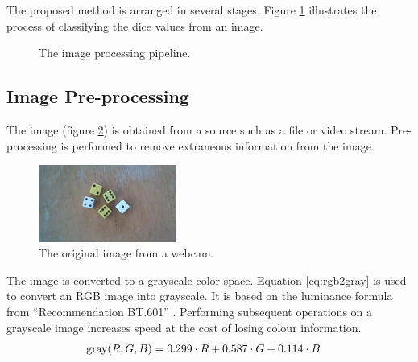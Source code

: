 \documentclass[conference]{IEEEtran}
\begin{document}
The proposed method is arranged in several stages.
Figure \ref{fig:stages} illustrates the process of classifying the dice values from an image. 
\begin{figure}[H]
	\centering
	\caption{The image processing pipeline.}
	\label{fig:stages}
\end{figure}

\subsection{Image Pre-processing}

The image (figure \ref{fig:original}) is obtained from a source such as a file or video stream.
Pre-processing is performed to remove extraneous information from the image.
\begin{figure}[H]
	\centering
	\includegraphics[width=0.4\textwidth]{original}
	\caption{The original image from a webcam.}
	\label{fig:original}
\end{figure}

The image is converted to a grayscale color-space.
Equation \ref{eq:rgb2gray} is used to convert an RGB image into grayscale.
It is based on the luminance formula from ``Recommendation BT.601'' \cite{R2011}.
Performing subsequent operations on a grayscale image increases speed at the cost of losing colour information.
\begin{align}
	\textnormal{gray}(R, G, B) &= 0.299 \cdot R + 0.587 \cdot G + 0.114 \cdot B \label{eq:rgb2gray}
\end{align}
\end{document}

